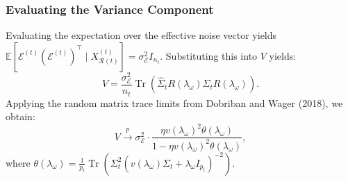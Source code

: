 \documentclass{article}
\begin{document}
\subsubsection{Evaluating the Variance Component}
Evaluating the expectation over the effective noise vector yields $\mathbb{E}[\mathcal{E}^{(t)} (\mathcal{E}^{(t)})^\top \mid X^{(t)}_{\mathcal{R}(t)}] = \sigma_{\mathcal{E}}^2 I_{n_t}$. Substituting this into $V$ yields:
\begin{equation}
V = \frac{\sigma_{\mathcal{E}}^2}{n_t} \operatorname{Tr}\left( \hat\Sigma_t R(\lambda_\omega) \Sigma_t R(\lambda_\omega) \right).
\end{equation}
Applying the random matrix trace limits from Dobriban and Wager (2018), we obtain:
\begin{equation}
V \xrightarrow{p} \sigma_{\mathcal{E}}^2 \cdot \frac{\eta v(\lambda_\omega)^2 \theta(\lambda_\omega)}{1 - \eta v(\lambda_\omega)^2 \theta(\lambda_\omega)},
\end{equation}
where $\theta(\lambda_\omega) = \frac{1}{p_t} \operatorname{Tr}\left( \Sigma_t^2 (v(\lambda_\omega) \Sigma_t + \lambda_\omega I_{p_t})^{-2} \right)$.
\end{document}
